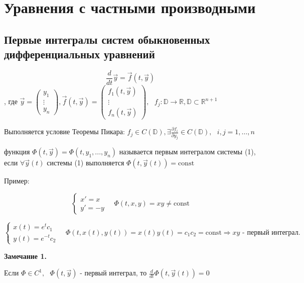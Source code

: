 \documentclass[12pt, a4paper]{report}
\begin{document}
\chapter{Уравнения с частными производными}

\section{Первые интегралы систем обыкновенных дифференциальных уравнений}

\[ \frac{d}{dt }  \vec{ y}  = \vec{ f } (t, \vec{ y}  ) \tag{1} \] 
, где \( \vec{y }  = \begin{pmatrix}
y_1 \\
\vdots\\
y_n
\end{pmatrix} , \vec{f } (t, \vec{ y}  ) = \begin{pmatrix}
f_1(t, \vec{y } )\\
\vdots\\
f_n(t, \vec{ y} )
\end{pmatrix}, \text{ }  f_j : \mathbb{D} \to  \mathbb{R} , \mathbb{D} \subset \mathbb{R}^{n+1} \) 

Выполняется условие Теоремы Пикара: \( f_j \in  C(\mathbb{D} ), \exists  \frac{\partial  f_i }{\partial  y_j } \in  C(\mathbb{D} ) , \text{ }  i,j = 1, \ldots,n  \) 

\begin{definition}
    функция \( \Phi (t, \vec{y } ) = \Phi(t, y_1 , ..., y_n )  \) называется первым интегралом системы (1), если \( \forall  \vec{y} (t ) \) системы (1) выполняется \( \Phi(t, \vec{ y}  (t )) = \mathrm{const}   \) 
\end{definition}

Пример: 

\[ \begin{cases}
x ' = x \\ 
y ' = -y
\end{cases} \quad  \Phi(t, x ,y) = x y \neq  \mathrm{const}   \] 

\[ \begin{cases}
    x(t )  = e^t c_1 \\
    y(t ) = e^{-t }  c_2
\end{cases}\quad  \Phi(t,x(t ), y(t )) = x(t ) y (t ) = c_1 c_2 = \mathrm{const }  \Rightarrow xy \text{ - первый интеграл.}  \]

\textbf{Замечание 1. } 

Если \( \Phi \in  C^1 , \text{ }  \Phi(t ,\vec{ y}  )  \)  - первый интеграл, то \( \displaystyle \frac{d}{dt }  \Phi(t, \vec{ y}  (t ))= 0 \)  \\
\end{document}
